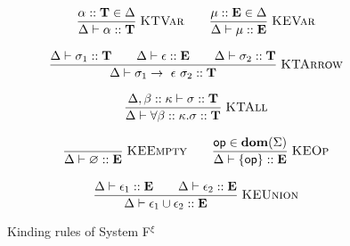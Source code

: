 \begin{figure}[p]
    \small
    \noindent\fbox{$\Delta \vdash \tau :: \kappa$}

    \medskip
    \begin{gather*}
        \frac{\alpha :: \mathbf{T} \in \Delta}
             {\Delta \vdash \alpha :: \mathbf{T}}
             \;\textsc{KTVar}
        \qquad
        \frac{\mu :: \mathbf{E} \in \Delta}
             {\Delta \vdash \mu :: \mathbf{E}}
             \;\textsc{KEVar}
        \\[8pt]
        \frac{\Delta \vdash \sigma_1 :: \mathbf{T}
              \qquad \Delta \vdash \epsilon :: \mathbf{E}
              \qquad \Delta \vdash \sigma_2 :: \mathbf{T}}
             {\Delta \vdash
              \sigma_1 \rightarrow~\epsilon~\sigma_2 :: \mathbf{T}}
             \;\textsc{KTArrow}
        \\[8pt]
        \frac{\Delta,\beta :: \kappa \vdash \sigma :: \mathbf{T}}
             {\Delta \vdash \forall\beta :: \kappa.\sigma :: \mathbf{T}}
             \;\textsc{KTAll}
        \\[8pt]
        \frac{}{\Delta\vdash\varnothing::\mathbf{E}}
             \;\textsc{KEEmpty}
        \qquad
        \frac{\mathsf{op}\in\mathbf{dom}(\Sigma)}
             {\Delta\vdash\{\mathsf{op}\}::\mathbf{E}}
             \;\textsc{KEOp}
        \\[8pt]
        \frac{\Delta\vdash\epsilon_1::\mathbf{E}
              \qquad\Delta\vdash\epsilon_2::\mathbf{E}}
             {\Delta\vdash\epsilon_1\cup\epsilon_2::\mathbf{E}}
             \;\textsc{KEUnion}
    \end{gather*}

    \caption{Kinding rules of System F$^{\xi}$}
    \label{systemf:kinding-rules}
\end{figure}
